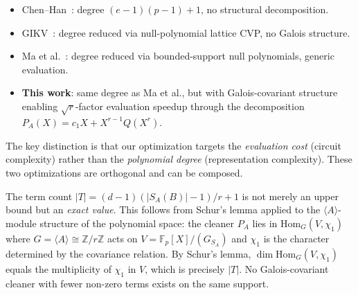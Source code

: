 \begin{remark}
\begin{itemize}
\item Chen--Han~\cite{CH18}: degree $(e-1)(p-1)+1$, no structural decomposition.
\item GIKV~\cite{GIKV23}: degree reduced via null-polynomial lattice CVP, no Galois structure.
\item Ma et al.~\cite{Ma24}: degree reduced via bounded-support null polynomials, generic evaluation.
\item \textbf{This work}: same degree as Ma et al., but with Galois-covariant structure enabling $\sqrt{r}$-factor evaluation speedup through the decomposition $P_A(X) = c_1 X + X^{r-1} Q(X^r)$.
\end{itemize}
The key distinction is that our optimization targets the \emph{evaluation cost} (circuit complexity) rather than the \emph{polynomial degree} (representation complexity).
These two optimizations are orthogonal and can be composed.
\end{remark}

\begin{remark}
The term count $|T| = (d-1)(|S_A(B)|-1)/r + 1$ is not merely an upper bound but an \emph{exact value}.
This follows from Schur's lemma applied to the $\langle A \rangle$-module structure of the polynomial space:
the cleaner $P_A$ lies in $\mathrm{Hom}_G(V, \chi_1)$ where $G = \langle A \rangle \cong \mathbb{Z}/r\mathbb{Z}$ acts on $V = \mathbb{F}_p[X]/(G_{S_A})$ and $\chi_1$ is the character determined by the covariance relation.
By Schur's lemma, $\dim \mathrm{Hom}_G(V, \chi_1)$ equals the multiplicity of $\chi_1$ in $V$, which is precisely $|T|$.
No Galois-covariant cleaner with fewer non-zero terms exists on the same support.
\end{remark}
